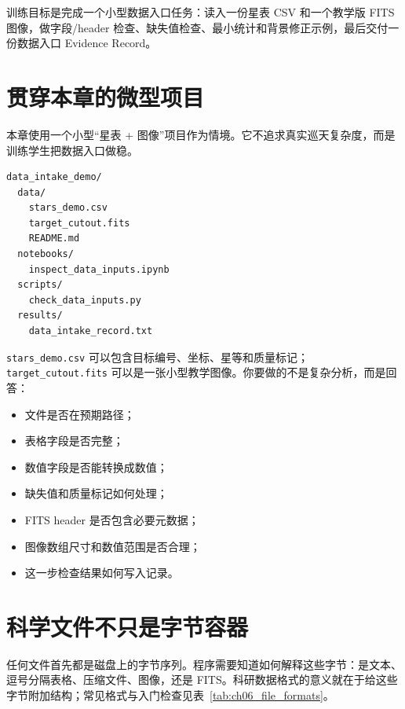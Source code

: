 训练目标是完成一个小型数据入口任务：读入一份星表 CSV 和一个教学版 FITS 图像，做字段/header 检查、缺失值检查、最小统计和背景修正示例，最后交付一份数据入口 Evidence Record。

\section{贯穿本章的微型项目}

本章使用一个小型“星表 + 图像”项目作为情境。它不追求真实巡天复杂度，而是训练学生把数据入口做稳。

\begin{examplebox}[最小数据入口项目]
\begin{lstlisting}[style=terminal]
data_intake_demo/
  data/
    stars_demo.csv
    target_cutout.fits
    README.md
  notebooks/
    inspect_data_inputs.ipynb
  scripts/
    check_data_inputs.py
  results/
    data_intake_record.txt
\end{lstlisting}
\end{examplebox}

\texttt{stars\_demo.csv} 可以包含目标编号、坐标、星等和质量标记；\texttt{target\_cutout.fits} 可以是一张小型教学图像。你要做的不是复杂分析，而是回答：

\begin{itemize}
    \item 文件是否在预期路径；
    \item 表格字段是否完整；
    \item 数值字段是否能转换成数值；
    \item 缺失值和质量标记如何处理；
    \item FITS header 是否包含必要元数据；
    \item 图像数组尺寸和数值范围是否合理；
    \item 这一步检查结果如何写入记录。
\end{itemize}

\section{科学文件不只是字节容器}

任何文件首先都是磁盘上的字节序列。程序需要知道如何解释这些字节：是文本、逗号分隔表格、压缩文件、图像，还是 FITS。科研数据格式的意义就在于给这些字节附加结构；常见格式与入门检查见表~\ref{tab:ch06_file_formats}。

